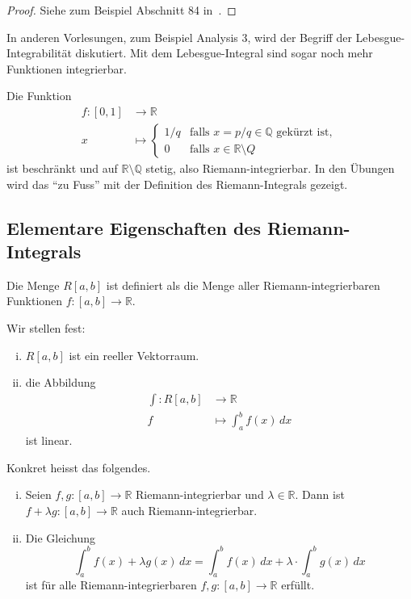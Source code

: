 \documentclass[../main.tex]{subfiles}
\begin{document}
\begin{proof}
  Siehe zum Beispiel Abschnitt 84 in~\cite{heuser}.
\end{proof}

In anderen Vorlesungen, zum Beispiel Analysis 3, wird
der Begriff der Lebesgue-Integrabilität diskutiert.
Mit dem Lebesgue-Integral sind sogar noch mehr Funktionen
integrierbar.

\begin{example}
  Die Funktion
  \begin{align*}
    f \colon [0, 1] & \to \mathbb{R} \\
    x & \mapsto 
    \begin{cases}
      1/q & \text{falls $x = p/q \in \mathbb{Q}$ gekürzt ist},\\
      0 & \text{falls $x \in \mathbb{R} \setminus Q$}
    \end{cases}
  \end{align*}
  ist beschränkt
  und auf $\mathbb{R} \setminus \mathbb{Q}$ stetig,
  also Riemann-integrierbar. In den Übungen wird das
  ``zu Fuss'' mit der Definition des Riemann-Integrals
  gezeigt.
\end{example}

\subsection*{Elementare Eigenschaften des Riemann-Integrals}
\begin{notation}
  Die Menge $R[a, b]$ ist definiert als
  die Menge aller Riemann-integrierbaren Funktionen
  $f \colon [a, b] \to \mathbb{R}$.
\end{notation}

Wir stellen fest:
\begin{enumerate}[(i)]
  \item $R[a, b]$ ist ein reeller Vektorraum.
  \item die Abbildung
    \begin{align*}
      \int \colon R[a,b] & \to \mathbb{R} \\
      f & \mapsto \int_{a}^{b} f(x) \, dx
    \end{align*}
    ist linear.
\end{enumerate}
Konkret heisst das folgendes.
\begin{enumerate}[(i)]
  \item Seien $f, g \colon [a, b] \to \mathbb{R}$
    Riemann-integrierbar und $\lambda \in \mathbb{R}$.
    Dann ist $f + \lambda g \colon [a, b] \to \mathbb{R}$ 
    auch Riemann-integrierbar.
  \item Die Gleichung
    \[
      \int_{a}^{b} f(x) + \lambda g(x) \, dx
      = \int_{a}^{b} f(x) \, dx
      + \lambda \cdot \int_{a}^{b} g(x) \, dx
    \]
    ist für alle Riemann-integrierbaren 
    $f, g \colon [a, b] \to \mathbb{R}$ 
    erfüllt.
\end{enumerate}
\end{document}
